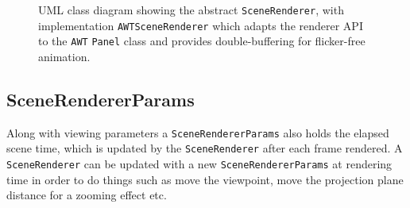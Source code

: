 \documentclass[10pt,aps, prb,preprint]{article}
\begin{document}
\begin{figure}[!h]
\label{fig:sceneRenderer}
\begin{center}
\caption{UML class diagram showing the abstract \texttt{SceneRenderer}, with implementation \texttt{AWTSceneRenderer} which adapts the renderer API to the \texttt{AWT} \texttt{Panel} class and provides double-buffering for flicker-free animation.}
\end{center}
\end{figure}

\subsection{SceneRendererParams}
\label{SceneRendererParams}
Along with viewing parameters a \texttt{SceneRendererParams} also holds the elapsed scene time, which is updated by the \texttt{SceneRenderer} after each frame rendered. A \texttt{SceneRenderer} can be updated with a new \texttt{SceneRendererParams} at rendering time in order to do things such as move the viewpoint, move the projection plane distance for a zooming effect etc.
\end{document}
